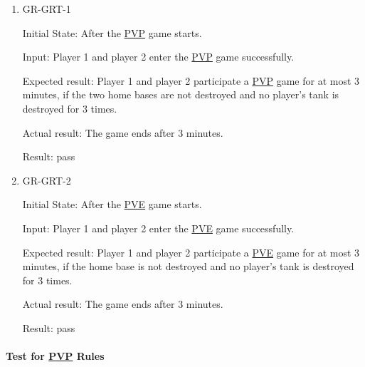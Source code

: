\documentclass[12pt, titlepage]{article}
\begin{document}
\begin{enumerate}

\item{GR-GRT-1\\}
					
Initial State: After the \underline{PVP} game starts.
					
Input: Player 1 and player 2 enter the \underline{PVP} game successfully.
					
Expected result: Player 1 and player 2 participate a \underline{PVP} game for at most 3 minutes, if the two home bases are not destroyed and no player's tank is destroyed for 3 times.
					
Actual result: The game ends after 3 minutes.

Result: pass

\item{GR-GRT-2\\}
					
Initial State: After the \underline{PVE} game starts.
					
Input: Player 1 and player 2 enter the \underline{PVE} game successfully.
					
Expected result: Player 1 and player 2 participate a \underline{PVE} game for at most 3 minutes, if the home base is not destroyed and no player's tank is destroyed for 3 times.
					
Actual result: The game ends after 3 minutes.

Result: pass

\end{enumerate}

\paragraph{Test for \underline{PVP} Rules}
\end{document}

